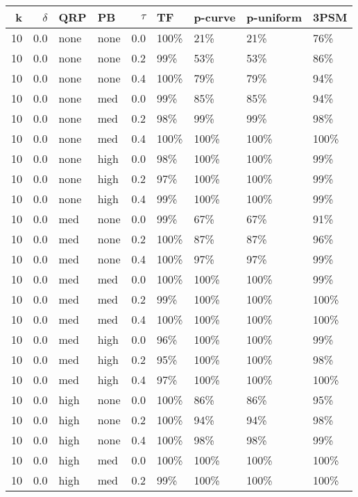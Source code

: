 \begin{longtable}{rrllrllll}
  \hline
{k} & {$\delta$} & {QRP} & {PB} & {$\tau$} & TF & p-curve & p-uniform & 3PSM \\ 
  \hline
10 & 0.0 & none & none & 0.0 & 100\% & 21\% & 21\% & 76\% \\ 
  10 & 0.0 & none & none & 0.2 & 99\% & 53\% & 53\% & 86\% \\ 
  10 & 0.0 & none & none & 0.4 & 100\% & 79\% & 79\% & 94\% \\ 
  10 & 0.0 & none & med & 0.0 & 99\% & 85\% & 85\% & 94\% \\ 
  10 & 0.0 & none & med & 0.2 & 98\% & 99\% & 99\% & 98\% \\ 
  10 & 0.0 & none & med & 0.4 & 100\% & 100\% & 100\% & 100\% \\ 
  10 & 0.0 & none & high & 0.0 & 98\% & 100\% & 100\% & 99\% \\ 
  10 & 0.0 & none & high & 0.2 & 97\% & 100\% & 100\% & 99\% \\ 
  10 & 0.0 & none & high & 0.4 & 99\% & 100\% & 100\% & 99\% \\ 
  10 & 0.0 & med & none & 0.0 & 99\% & 67\% & 67\% & 91\% \\ 
  10 & 0.0 & med & none & 0.2 & 100\% & 87\% & 87\% & 96\% \\ 
  10 & 0.0 & med & none & 0.4 & 100\% & 97\% & 97\% & 99\% \\ 
  10 & 0.0 & med & med & 0.0 & 100\% & 100\% & 100\% & 99\% \\ 
  10 & 0.0 & med & med & 0.2 & 99\% & 100\% & 100\% & 100\% \\ 
  10 & 0.0 & med & med & 0.4 & 100\% & 100\% & 100\% & 100\% \\ 
  10 & 0.0 & med & high & 0.0 & 96\% & 100\% & 100\% & 99\% \\ 
  10 & 0.0 & med & high & 0.2 & 95\% & 100\% & 100\% & 98\% \\ 
  10 & 0.0 & med & high & 0.4 & 97\% & 100\% & 100\% & 100\% \\ 
  10 & 0.0 & high & none & 0.0 & 100\% & 86\% & 86\% & 95\% \\ 
  10 & 0.0 & high & none & 0.2 & 100\% & 94\% & 94\% & 98\% \\ 
  10 & 0.0 & high & none & 0.4 & 100\% & 98\% & 98\% & 99\% \\ 
  10 & 0.0 & high & med & 0.0 & 100\% & 100\% & 100\% & 100\% \\ 
  10 & 0.0 & high & med & 0.2 & 99\% & 100\% & 100\% & 100\% \\ 

\end{longtable}
